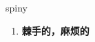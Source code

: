 
\begin{frame}
{\huge spiny}
\begin{center}
\begin{enumerate}\Large
  \item \textbf{棘手的，麻烦的}
\end{enumerate}
\end{center}
\end{frame}
